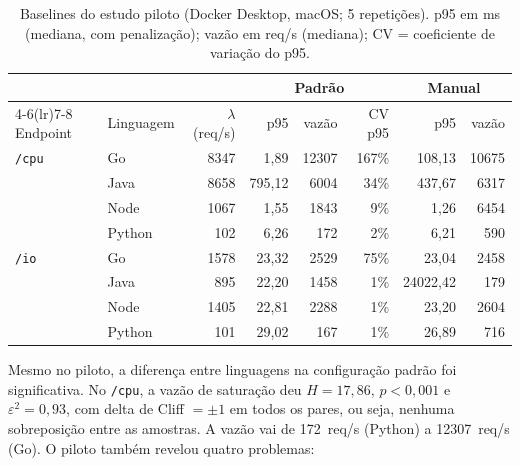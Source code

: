 \documentclass[11pt,a4paper]{article}
\begin{document}
\begin{table}[ht]
\centering
\caption{Baselines do estudo piloto (Docker Desktop, macOS; 5 repetições). p95 em ms (mediana, com penalização);
vazão em req/s (mediana); CV = coeficiente de variação do p95.}
\label{tab:piloto}
\small
\begin{tabular}{llrrrrrr}
\toprule
 & & & \multicolumn{3}{c}{Padrão} & \multicolumn{2}{c}{Manual} \\
\cmidrule(lr){4-6}\cmidrule(lr){7-8}
Endpoint & Linguagem & $\lambda$ (req/s) & p95 & vazão & CV p95 & p95 & vazão \\
\midrule
\texttt{/cpu} & Go     & 8347 & 1,89   & 12307 & 167\% & 108,13 & 10675 \\
              & Java   & 8658 & 795,12 & 6004  & 34\%  & 437,67 & 6317 \\
              & Node   & 1067 & 1,55   & 1843  & 9\%   & 1,26   & 6454 \\
              & Python & 102  & 6,26   & 172   & 2\%   & 6,21   & 590 \\
\midrule
\texttt{/io}  & Go     & 1578 & 23,32  & 2529  & 75\%  & 23,04  & 2458 \\
              & Java   & 895  & 22,20  & 1458  & 1\%   & 24022,42 & 179 \\
              & Node   & 1405 & 22,81  & 2288  & 1\%   & 23,20  & 2604 \\
              & Python & 101  & 29,02  & 167   & 1\%   & 26,89  & 716 \\
\bottomrule
\end{tabular}
\end{table}

Mesmo no piloto, a diferença entre linguagens na configuração padrão foi significativa. No \texttt{/cpu}, a vazão
de saturação deu $H = 17{,}86$, $p < 0{,}001$ e $\varepsilon^2 = 0{,}93$, com delta de Cliff $= \pm 1$ em todos os pares,
ou seja, nenhuma sobreposição entre as amostras. A vazão vai de \SI{172}{req/s} (Python) a \SI{12307}{req/s} (Go).
O piloto também revelou quatro problemas:
\end{document}
